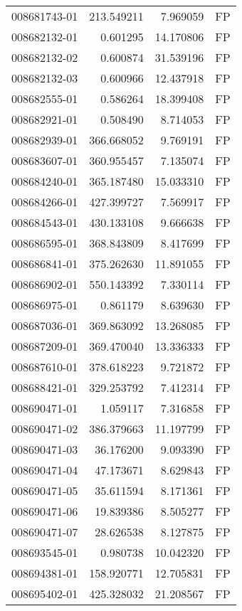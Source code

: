 \begin{tabular}{lrrl}
008681743-01 &  213.549211 &     7.969059 &   FP \\
008682132-01 &    0.601295 &    14.170806 &   FP \\
008682132-02 &    0.600874 &    31.539196 &   FP \\
008682132-03 &    0.600966 &    12.437918 &   FP \\
008682555-01 &    0.586264 &    18.399408 &   FP \\
008682921-01 &    0.508490 &     8.714053 &   FP \\
008682939-01 &  366.668052 &     9.769191 &   FP \\
008683607-01 &  360.955457 &     7.135074 &   FP \\
008684240-01 &  365.187480 &    15.033310 &   FP \\
008684266-01 &  427.399727 &     7.569917 &   FP \\
008684543-01 &  430.133108 &     9.666638 &   FP \\
008686595-01 &  368.843809 &     8.417699 &   FP \\
008686841-01 &  375.262630 &    11.891055 &   FP \\
008686902-01 &  550.143392 &     7.330114 &   FP \\
008686975-01 &    0.861179 &     8.639630 &   FP \\
008687036-01 &  369.863092 &    13.268085 &   FP \\
008687209-01 &  369.470040 &    13.336333 &   FP \\
008687610-01 &  378.618223 &     9.721872 &   FP \\
008688421-01 &  329.253792 &     7.412314 &   FP \\
008690471-01 &    1.059117 &     7.316858 &   FP \\
008690471-02 &  386.379663 &    11.197799 &   FP \\
008690471-03 &   36.176200 &     9.093390 &   FP \\
008690471-04 &   47.173671 &     8.629843 &   FP \\
008690471-05 &   35.611594 &     8.171361 &   FP \\
008690471-06 &   19.839386 &     8.505277 &   FP \\
008690471-07 &   28.626538 &     8.127875 &   FP \\
008693545-01 &    0.980738 &    10.042320 &   FP \\
008694381-01 &  158.920771 &    12.705831 &   FP \\
008695402-01 &  425.328032 &    21.208567 &   FP \\

\end{tabular}
